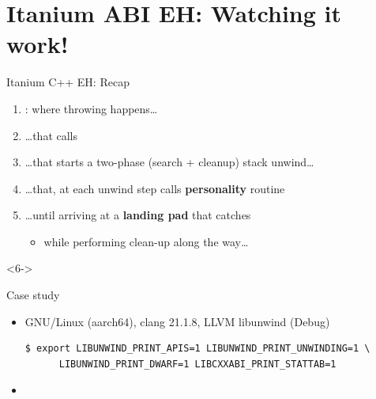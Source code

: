 \section{Itanium ABI EH: Watching it work!}
\begin{frame}{Itanium C++ EH: Recap}
  \begin{enumerate}
  \item {}: where throwing happens\ldots{}
    \pause

  \item \ldots{}that calls 
    \pause

  \item \ldots{}that starts a two-phase (search + cleanup) stack unwind\ldots{}
    \pause

  \item \ldots{}that, at each unwind step calls \alert{\bfseries personality} routine
    \begin{center}
      \resizebox{0.5\textwidth}{!}{}
    \end{center}
    \pause

  \item \ldots{}until arriving at a \alert{\bfseries landing pad} that catches
    \begin{itemize}
    \item while performing \alert{clean-up} along the way\ldots{}
    \end{itemize}
  \end{enumerate}

  \begin{onlyenv}<6->
  \end{onlyenv}
\end{frame}


\begin{frame}[fragile]{Case study}
  \begin{itemize}
  \item GNU/Linux (aarch64), clang 21.1.8, LLVM libunwind (Debug)
    \begin{lstlisting}[style=bash,basicstyle={\ttfamily\footnotesize}]
$ export LIBUNWIND_PRINT_APIS=1 LIBUNWIND_PRINT_UNWINDING=1 \
      LIBUNWIND_PRINT_DWARF=1 LIBCXXABI_PRINT_STATTAB=1
    \end{lstlisting}
    \medskip

  \item {}
  \end{itemize}
\end{frame}


